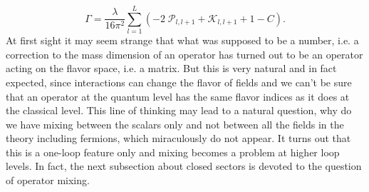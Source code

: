 \begin{equation}
	\Gamma = \frac{\lambda}{16\pi^2}\sum_{l=1}^L \left( - 2 \; \mathcal{P}_{l,l+1} + \mathcal{K}_{l,l+1} + 1 - C\right).
\end{equation}
At first sight it may seem strange that what was supposed to be a number, i.e. a correction to the mass dimension of an operator has turned out to be an operator acting on the flavor space, i.e. a matrix. But this is very natural and in fact expected, since interactions can change the flavor of fields and we can't be sure that an operator at the quantum level has the same flavor indices as it does at the classical level. This line of thinking may lead to a natural question, why do we have mixing between the scalars only and not between all the fields in the theory including fermions, which miraculously do not appear. It turns out that this is a one-loop feature only and mixing becomes a problem at higher loop levels. In fact, the next subsection about closed sectors is devoted to the question of operator mixing. 

